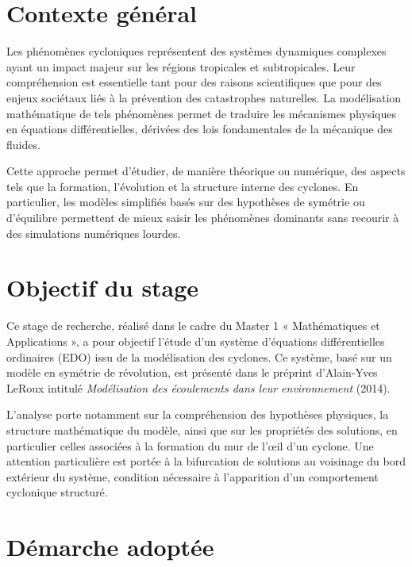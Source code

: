 \section*{Contexte général}

Les phénomènes cycloniques représentent des systèmes dynamiques complexes ayant un impact majeur sur les régions tropicales et subtropicales. Leur compréhension est essentielle tant pour des raisons scientifiques que pour des enjeux sociétaux liés à la prévention des catastrophes naturelles. La modélisation mathématique de tels phénomènes permet de traduire les mécanismes physiques en équations différentielles, dérivées des lois fondamentales de la mécanique des fluides.

Cette approche permet d'étudier, de manière théorique ou numérique, des aspects tels que la formation, l'évolution et la structure interne des cyclones. En particulier, les modèles simplifiés basés sur des hypothèses de symétrie ou d’équilibre permettent de mieux saisir les phénomènes dominants sans recourir à des simulations numériques lourdes.

\section*{Objectif du stage}

Ce stage de recherche, réalisé dans le cadre du Master 1 « Mathématiques et Applications », a pour objectif l’étude d’un système d’équations différentielles ordinaires (EDO) issu de la modélisation des cyclones. Ce système, basé sur un modèle en symétrie de révolution, est présenté dans le préprint d’Alain-Yves LeRoux intitulé \textit{Modélisation des écoulements dans leur environnement} (2014).

L’analyse porte notamment sur la compréhension des hypothèses physiques, la structure mathématique du modèle, ainsi que sur les propriétés des solutions, en particulier celles associées à la formation du mur de l’œil d’un cyclone. Une attention particulière est portée à la bifurcation de solutions au voisinage du bord extérieur du système, condition nécessaire à l’apparition d’un comportement cyclonique structuré.

\section*{Démarche adoptée}

